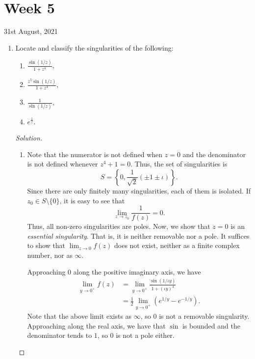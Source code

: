 \documentclass[11pt]{article}
\theoremstyle{definition}
\newenvironment{soln}{\begin{proof}[Solution]}{\end{proof}}
\begin{document}
\newpage

\section{Week 5}

\begin{center}
    31st August, 2021
\end{center}
\begin{enumerate}[leftmargin=*]
    \itemsep0.5em
    \item Locate and classify the singularities of the following:
    
    \begin{enumerate}
        \item $\displaystyle\frac{\sin(1/z)}{1+z^4}$,
        \item $\displaystyle\frac{z^5\sin(1/z)}{1+z^4}$,
        \item $\displaystyle\frac{1}{\sin(1/z)}$,
        \item $\displaystyle e^{\frac{1}{z}}$.
    \end{enumerate}
    
    \begin{soln} \phantom{hi}
        \begin{enumerate}
            \item Note that the numerator is not defined when $z = 0$ and the denominator is not defined whenever $z^4 + 1 = 0$. Thus, the set of singularities is
        \[
            S = \left\{ 0,  \frac{1}{\sqrt{2}}(\pm1\pm \iota) \right\}.
        \]
        Since there are only finitely many singularities, each of them is isolated. If $z_0 \in S \setminus \{0\}$, it is easy to see that 
        \[
            \lim_{z \to z_0} \frac{1}{f(z)} = 0.
        \]  
        Thus, all non-zero singularities are poles. Now, we show that $z=0$ is an \emph{essential singularity}. That is, it is neither removable nor a pole. It suffices to show that $\displaystyle\lim_{z \to 0} f(z)$ does not exist, neither as a finite complex number, nor as $\infty$. 
        
        Approaching $0$ along the positive imaginary axis, we have
        \begin{align*}
            \lim_{y \to 0^+} f(z) &= \lim_{y \to 0^+} \frac{\sin(1/\iota y)}{1 + (\iota y)^4} \\
            &= \frac{1}{2} \lim_{y \to 0^+} (e^{1/y} - e^{-1/y}).
        \end{align*}
        Note that the above limit exists as $\infty$, so $0$ is not a removable singularity. Approaching along the real axis, we have that $\sin$ is bounded and the denominator tends to $1$, so $0$ is not a pole either.
        

\end{enumerate}
\end{soln}
\end{enumerate}
\end{document}
